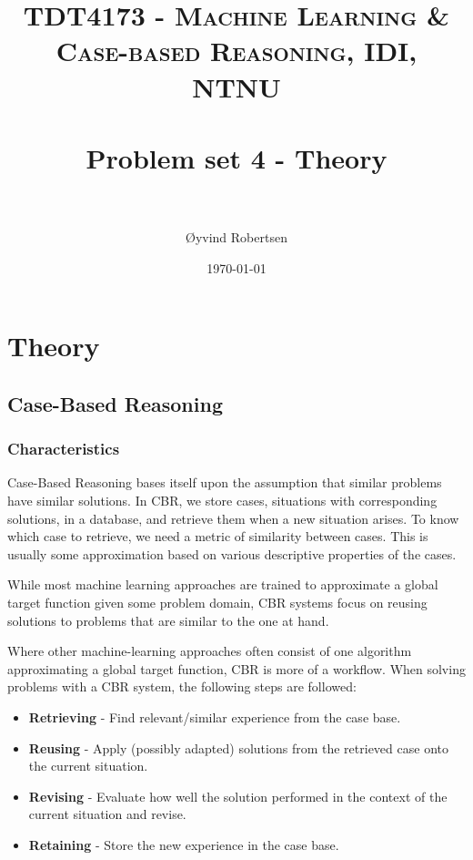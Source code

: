 \documentclass[paper=a4, fontsize=11pt]{scrartcl} %
\title{	
    \normalfont \normalsize 
    \textsc{TDT4173 - Machine Learning \& Case-based Reasoning, IDI, NTNU} \\ [25pt] %
    \horrule{0.5pt} \\[0.4cm] %
    \huge Problem set 4 - Theory \\ %
    \horrule{2pt} \\[0.5cm] %
}
\author{Øyvind Robertsen} %
\date{\normalsize\today} %
\numberwithin{equation}{section} %
\numberwithin{figure}{section} %
\numberwithin{table}{section} %
\begin{document}
\maketitle %


\section{Theory}

\subsection{Case-Based Reasoning}

\subsubsection{Characteristics}

Case-Based Reasoning bases itself upon the assumption that similar problems have similar solutions.
In CBR, we store cases, situations with corresponding solutions, in a database, and retrieve them when a new situation arises.
To know which case to retrieve, we need a metric of similarity between cases.
This is usually some approximation based on various descriptive properties of the cases.

While most machine learning approaches are trained to approximate a global target function given some problem domain, CBR systems focus on reusing solutions to problems that are similar to the one at hand.

Where other machine-learning approaches often consist of one algorithm approximating a global target function, CBR is more of a workflow.
When solving problems with a CBR system, the following steps are followed:

\begin{itemize}
    \item \textbf{Retrieving} - Find relevant/similar experience from the case base.
    \item \textbf{Reusing} - Apply (possibly adapted) solutions from the retrieved case onto the current situation.
    \item \textbf{Revising} - Evaluate how well the solution performed in the context of the current situation and revise.
    \item \textbf{Retaining} - Store the new experience in the case base.
\end{itemize}
\end{document}
